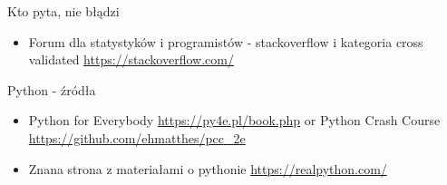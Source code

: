 \documentclass{beamer}
\begin{document}
\begin{frame}{Kto pyta, nie błądzi}
  \begin{itemize}
  \item Forum dla statystyków i programistów - stackoverflow i kategoria cross validated \url{https://stackoverflow.com/}
  \end{itemize}
\end{frame}

\begin{frame}{Python - źródła}
  \begin{itemize}
  \item Python for Everybody \url{https://py4e.pl/book.php} or Python Crash Course \url{https://github.com/ehmatthes/pcc_2e}
  \item Znana strona z materiałami o pythonie \url{https://realpython.com/}
  \end{itemize}
\end{frame}
\end{document}
